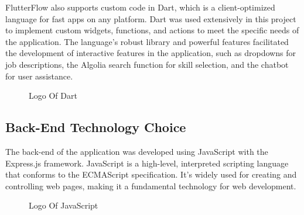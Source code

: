FlutterFlow also supports custom code in {\color{purple} Dart}, which is a client-optimized language for fast apps on any platform. Dart was used extensively in this project to implement custom widgets, functions, and actions to meet the specific needs of the application. The language's robust library and powerful features facilitated the development of interactive features in the application, such as dropdowns for job descriptions, the Algolia search function for skill selection, and the chatbot for user assistance.

\begin{figure}[H]
    \centering
    \caption{  Logo Of Dart }
    \label{fig: Dart_Logo}
\end{figure}

\subsection{Back-End Technology Choice} 
The back-end of the application was developed using {\color{purple}JavaScript} with the {\color{purple}Express.js} framework. JavaScript is a high-level, interpreted scripting language that conforms to the ECMAScript specification. It's widely used for creating and controlling web pages, making it a fundamental technology for web development.

\begin{figure}[H]
    \centering
    \caption{  Logo Of JavaScript }
    \label{fig: JS_Logo}
\end{figure}

